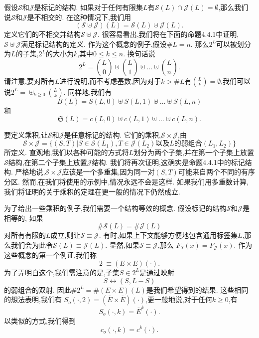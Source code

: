 \documentclass[a4paper,12pt]{ctexbook}
\begin{document}
假设$\mathcal{S}$和$\mathcal{J}$是标记的结构.  如果对于任何有限集$L$有$\mathcal{S}(L)\cap\mathcal{J}(L)=\emptyset$,那么我们说$\mathcal{S}$和$\mathcal{J}$是{\kaishu 不相交}的.  在这种情况下,我们用
$$(\mathcal{S}\uplus\mathcal{J})(L)=\mathcal{S}(L)\uplus\mathcal{J}(L). $$
定义它们的{\kaishu 不相交并结构}$\mathcal{S}\uplus\mathcal{J}. $
很容易看出,我们将在下面的命题4.4.1中证明,$\mathcal{S}\uplus\mathcal{J}$满足标记结构的定义.  作为这个概念的例子,假设$\#L=n$.  那么$2^L$可以被划分为$L$的子集,$2^L$的大小为$k$,其中$0\le k\le n$. 换句话说
\begin{equation}
     2^L=\binom{L}{0}\uplus\binom{L}{1}\uplus\dots\uplus\binom{L}{n}. 
\end{equation}
请注意,要对所有$L$进行说明,而不考虑基数,因为对于$k>\#L$有$\binom{L}{k}=\emptyset$,我们可以说$ 2^L=\uplus_{k\ge 0}\binom{L}{k}$. 
同样地,我们有
\begin{equation}
B(L)=S(L,0)\uplus S(L,1)\uplus \dots \uplus S(L,n)
\end{equation}
和
\begin{equation}
\mathfrak{S}(L)=c(L,0)\uplus c(L,1)\uplus \dots \uplus c(L,n). 
\end{equation}

要定义乘积,让$\mathcal{S}$和$\mathcal{J}$是任意标记的结构.  它们的{\kaishu 乘积},$\mathcal{S}\times\mathcal{J}$,由
$$\mathcal{S}\times\mathcal{J}=\{(S,T)|S\in\mathcal{S}(L_1),T\in\mathcal{J}(L_2)
\text{以及}L\text{的弱组合}(L_1,L_2)
\}$$
所定义.  
直观地,我们以各种可能的方式将$L$划分为两个子集,并在第一个子集上放置$\mathcal{S}$结构,在第二个子集上放置$\mathcal{J}$结构.  我们将再次证明,这确实是命题4.4.1中的标记结构.  严格地说,$\mathcal{S}\times\mathcal{J}$应该是一个多重集,因为同一对$(S,T)$可能来自两个不同的有序分区.  然而,在我们将使用的示例中,情况永远不会是这样.  
如果我们用多重数计算,我们将证明的关于乘积的定理在更一般的情况下仍然成立.  

为了给出一些乘积的例子,我们需要一个结构等效的概念.  假设标记的结构$\mathcal{S}$和$\mathcal{J}$是相等的,
如果$$\#\mathcal{S}(L)=\#\mathcal{J}(L)$$对所有有限的$L$成立,则让$\mathcal{S}\equiv\mathcal{J}$.  
有时,如果上下文能够方便地包含通用标签集$L$,那么我们会为此令$\mathcal{S}(L)\equiv\mathcal{J}(L)$.  显然,如果$\mathcal{S}\equiv\mathcal{J}$,那么
$F_\mathcal{S}(x)=F_\mathcal{J}(x)$. 
作为这些概念的第一个例证,我们称
\begin{equation}
2^\cdot\equiv(E\times E)(\cdot). 
\end{equation}
为了弄明白这个,我们需注意的是,子集$S\in 2^L$是通过映射
$$S\leftrightarrow(S,L-S)$$
的弱组合的双射. 
因此$\#2^L=\#(E\times E)(L)$是我们希望得到的结果.  这些相同的想法表明,我们有
$S_o(\cdot,2)=(\bar{E}\times \bar{E})(\cdot)$,更一般地说,对于任何$k\ge 0$,有
\begin{equation}
S_o(\cdot,k)={\bar{E}}^k(\cdot). 
\end{equation}
以类似的方式,我们得到
\begin{equation}
c_o(\cdot,k)={c}^k(\cdot). 
\end{equation}
 
\end{document}
